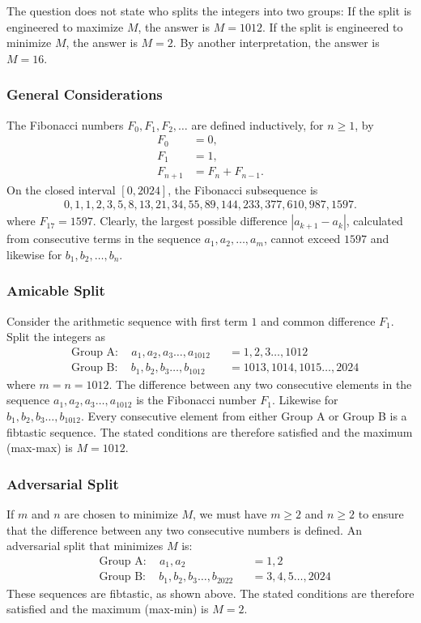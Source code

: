 
The question does not state who splits the integers into two groups: If the split is engineered to maximize $M$, the answer is $M=1012$. If the split is engineered to minimize $M$, the answer is $M=2$. By another interpretation, the answer is $M=16$.

\subsubsection*{General Considerations}

The Fibonacci numbers $F_{0},F_{1},F_{2},\ldots$ are defined inductively, for $n \ge 1$, by 
\begin{align*}
F_{0} & = 0, \\
F_{1} & = 1, \\ 
F_{n+1} & = F_{n} + F_{n-1}.
\end{align*}
On the closed interval $[0,2024]$, the Fibonacci subsequence is 
\begin{align*}
0, 1, 1, 2, 3, 5, 8, 13, 21, 34, 55, 89, 144, 233, 377, 610, 987, 1597.
\end{align*}
where $F_{17}=1597$.
Clearly, the largest possible difference $|a_{k+1}-a_{k}|$, calculated from consecutive terms in the sequence $a_{1},a_{2},\ldots,a_{m}$, cannot exceed $1597$ and likewise for $b_{1},b_{2},\ldots,b_{n}$. 


\subsubsection*{Amicable Split}

Consider the arithmetic sequence with first term $1$ and common difference $F_{1}$. Split the integers as
\begin{align*}
& \text{Group A}: 
\quad
a_{1},a_{2},a_{3}\ldots,a_{1012}
&& = 1,2,3\ldots,1012
\\
& \text{Group B}: 
\quad
b_{1},b_{2},b_{3}\ldots,b_{1012}
&& = 1013,1014,1015\ldots,2024
\end{align*}
where $m=n=1012$.
The difference between any two consecutive elements in the sequence $a_{1},a_{2},a_{3}\ldots,a_{1012}$ is the Fibonacci number $F_{1}$. Likewise for $b_{1},b_{2},b_{3}\ldots,b_{1012}$. Every consecutive element from either Group A or Group B is a fibtastic sequence. The stated conditions are therefore satisfied and the maximum (max-max) is $M=1012$.

\subsubsection*{Adversarial Split}
If $m$ and $n$ are chosen to minimize $M$, we must have $m\ge2$ and $n\ge2$ to ensure that the difference between any two consecutive numbers is defined. An adversarial split that minimizes $M$ is:
\begin{align*}
& \text{Group A}: 
\quad
a_{1}, a_{2}
&& = 1, 2
\\
& \text{Group B}: 
\quad
b_{1},b_{2},b_{3}\ldots,b_{2022}
&& = 3,4,5\ldots,2024
\end{align*}
These sequences are fibtastic, as shown above. The stated conditions are therefore satisfied and the maximum (max-min) is $M=2$. 

